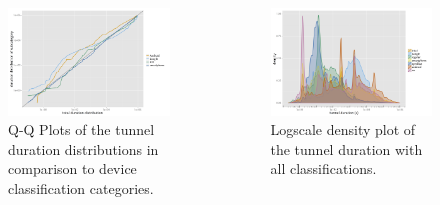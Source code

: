 \documentclass{beamer}
\begin{document}
\begin{frame}
	\begin{columns}[T]
		\begin{figure}
			\centering
			\includegraphics[width=\columnwidth]{extras/R-duration-qq-category-comparison.png}
			\caption{Q-Q Plots of the tunnel duration distributions in comparison to device classification categories.}
		\end{figure}

		\begin{figure}
			\includegraphics[width=\columnwidth]{extras/R-duration-classification-density.png}
			\caption{Logscale density plot of the tunnel duration with all classifications.}
		\end{figure}
	\end{columns}
\end{frame}
\end{document}
